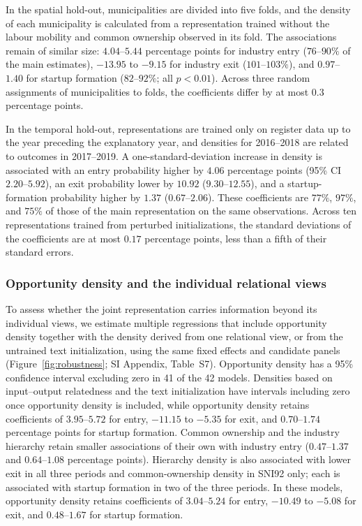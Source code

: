 \documentclass[9pt,twocolumn,twoside]{pnas-new}
\begin{document}
In the spatial hold-out, municipalities are divided into five folds, and the density of each municipality is calculated from a representation trained without the labour mobility and common ownership observed in its fold. The associations remain of similar size: $4.04$--$5.44$ percentage points for industry entry ($76$--$90\%$ of the main estimates), $-13.95$ to $-9.15$ for industry exit ($101$--$103\%$), and $0.97$--$1.40$ for startup formation ($82$--$92\%$; all $p<0.01$). Across three random assignments of municipalities to folds, the coefficients differ by at most $0.3$ percentage points.

In the temporal hold-out, representations are trained only on register data up to the year preceding the explanatory year, and densities for 2016--2018 are related to outcomes in 2017--2019. A one-standard-deviation increase in density is associated with an entry probability higher by $4.06$ percentage points (95\% CI $2.20$--$5.92$), an exit probability lower by $10.92$ ($9.30$--$12.55$), and a startup-formation probability higher by $1.37$ ($0.67$--$2.06$). These coefficients are $77\%$, $97\%$, and $75\%$ of those of the main representation on the same observations. Across ten representations trained from perturbed initializations, the standard deviations of the coefficients are at most $0.17$ percentage points, less than a fifth of their standard errors.

\subsubsection{Opportunity density and the individual relational views}

To assess whether the joint representation carries information beyond its individual views, we estimate multiple regressions that include opportunity density together with the density derived from one relational view, or from the untrained text initialization, using the same fixed effects and candidate panels (Figure~\ref{fig:robustness}; SI Appendix, Table~S7). Opportunity density has a 95\% confidence interval excluding zero in 41 of the 42 models. Densities based on input--output relatedness and the text initialization have intervals including zero once opportunity density is included, while opportunity density retains coefficients of $3.95$--$5.72$ for entry, $-11.15$ to $-5.35$ for exit, and $0.70$--$1.74$ percentage points for startup formation. Common ownership and the industry hierarchy retain smaller associations of their own with industry entry ($0.47$--$1.37$ and $0.64$--$1.08$ percentage points). Hierarchy density is also associated with lower exit in all three periods and common-ownership density in SNI92 only; each is associated with startup formation in two of the three periods. In these models, opportunity density retains coefficients of $3.04$--$5.24$ for entry, $-10.49$ to $-5.08$ for exit, and $0.48$--$1.67$ for startup formation.
\end{document}
